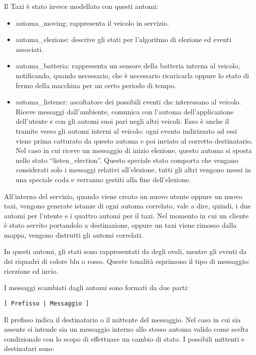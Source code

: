 Il Taxi è stato invece modellato con questi automi:
\begin{itemize} 
 \item automa\_moving: rappresenta il veicolo in servizio.
 \item automa\_elezione: descrive gli stati per l'algoritmo di elezione ed eventi associati. 
 \item automa\_batteria: rappresenta un sensore della batteria interna al veicolo, notificando, quando necessario, che è necessario ricaricarla oppure lo stato di fermo della macchina per un certo periodo di tempo.
 \item automa\_listener: ascoltatore dei possibili eventi che interessano al veicolo. Riceve messaggi dall'ambiente, comunica con l'automa dell'applicazione dell'utente e con gli automi suoi pari negli altri veicoli. Esso è anche il tramite verso gli automi interni al veicolo: ogni evento indirizzato ad essi viene prima catturato da questo automa e poi inviato al corretto destinatario. Nel caso in cui riceve un messaggio di inizio elezione, questo automa si sposta nello stato ``listen\_election''. Questo speciale stato comporta che vengano considerati solo i messaggi relativi all'elezione, tutti gli altri vengono messi in una speciale coda e verranno gestiti alla fine dell'elezione.
\end{itemize} 

All'interno del servizio, quando viene creato un nuovo utente oppure un nuovo taxi, vengono generate istanze di ogni automa correlato, vale a dire, quindi, i due automi per l'utente e i quattro automi per il taxi. Nel momento in cui un cliente è stato servito portandolo a destinazione, oppure un taxi viene rimosso dalla mappa, vengono distrutti gli automi correlati.

In questi automi, gli stati sono rappresentati da degli ovali, mentre gli eventi da dei riquadri di colore blu o rosso. Queste tonalità esprimono il tipo di messaggio: ricezione ed invio.

I messaggi scambiati dagli automi sono formati da due parti:
\begin{lstlisting} 
[ Prefisso | Messaggio ]
\end{lstlisting}

Il prefisso indica il destinatario o il mittente del messaggio. Nel caso in cui sia assente si intende sia un messaggio interno allo stesso automa valido come scelta condizionale con lo scopo di effettuare un cambio di stato. I possibili mittenti e destinatari sono:

